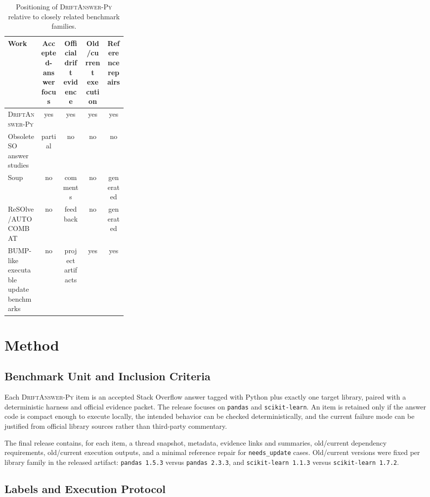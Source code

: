 \documentclass{article}
\newcommand{\dataset}{\textsc{DriftAnswer-Py}}
\newcommand{\needsupdate}{\texttt{needs\_update}}
\begin{document}
\begin{table}[t]
\caption{Positioning of \dataset{} relative to closely related benchmark families.}
\label{tab:positioning}
\centering
\small
\begin{tabular}{p{0.28\linewidth}cccc}
\toprule
Work & Accepted-answer focus & Official drift evidence & Old/current execution & Reference repairs \\
\midrule
\dataset{} & yes & yes & yes & yes \\
Obsolete SO answer studies & partial & no & no & no \\
Soup \citep{Mai2025TowardsBetterAnswers} & no & comments & no & generated \\
ReSOlve/AUTOCOMBAT \citep{Bappon2026} & no & feedback & no & generated \\
BUMP-like executable update benchmarks & no & project artifacts & yes & yes \\
\bottomrule
\end{tabular}
\end{table}

\section{Method}
\label{sec:method}

\subsection{Benchmark Unit and Inclusion Criteria}

Each \dataset{} item is an accepted Stack Overflow answer tagged with Python plus exactly one target library, paired with a deterministic harness and official evidence packet. The release focuses on \texttt{pandas} and \texttt{scikit-learn}. An item is retained only if the answer code is compact enough to execute locally, the intended behavior can be checked deterministically, and the current failure mode can be justified from official library sources rather than third-party commentary.

The final release contains, for each item, a thread snapshot, metadata, evidence links and summaries, old/current dependency requirements, old/current execution outputs, and a minimal reference repair for \needsupdate{} cases. Old/current versions were fixed per library family in the released artifact: \texttt{pandas~1.5.3} versus \texttt{pandas~2.3.3}, and \texttt{scikit-learn~1.1.3} versus \texttt{scikit-learn~1.7.2}.

\subsection{Labels and Execution Protocol}
\end{document}
